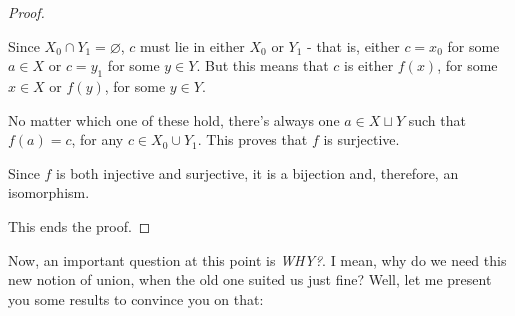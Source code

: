\begin{proof}
\begin{itemize}
		Since $X_0\cap Y_1=\varnothing$, $c$ must lie in either $X_0$ or $Y_1$ - that is, either $c=x_0$ for some $a\in X$ or $c=y_1$ for some $y\in Y$. But this means that $c$ is either $f(x)$, for some $x\in X$ or $f(y)$, for some $y\in Y$.
		
		No matter which one of these hold, there's always one $a\in X\sqcup Y$ such that $f(a)=c$, for any $c\in X_0\cup Y_1$. This proves that $f$ is surjective.
	\end{itemize}

Since $f$ is both injective and surjective, it is a bijection and, therefore, an isomorphism.

This ends the proof.
\end{proof}

Now, an important question at this point is \textit{WHY?}. I mean, why do we need this new notion of union, when the old one suited us just fine? Well, let me present you some results to convince you on that:

